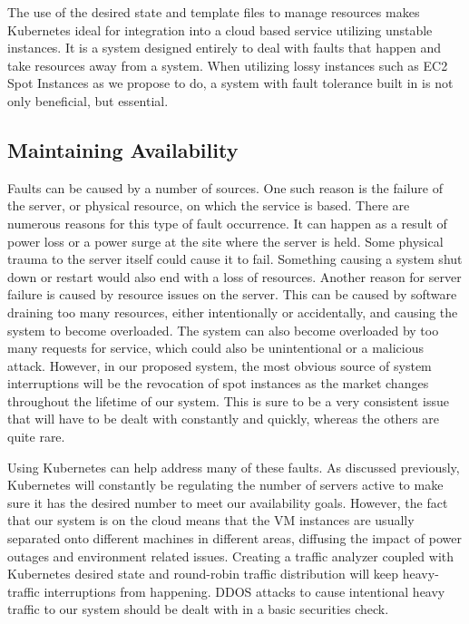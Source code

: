 \documentclass[thesis,proposal]{umassthesis}  %
\begin{document}
	The use of the desired state and template files to manage resources makes Kubernetes ideal for integration into a cloud based service utilizing unstable instances. It is a system designed entirely to deal with faults that happen and take resources away from a system. When utilizing lossy instances such as EC2 Spot Instances as we propose to do, a system with fault tolerance built in is not only beneficial, but essential.\par
    
\subsection{Maintaining Availability}

Faults can be caused by a number of sources. One such reason is the failure of the server, or physical resource, on which the service is based. There are numerous reasons for this type of fault occurrence. It can happen as a result of power loss or a power surge at the site where the server is held. Some physical trauma to the server itself could cause it to fail. Something causing a system shut down or restart would also end with a loss of resources. Another reason for server failure is caused by resource issues on the server. This can be caused by software draining too many resources, either intentionally or accidentally, and causing the system to become overloaded. The system can also become overloaded by too many requests for service, which could also be unintentional or a malicious attack. However, in our proposed system, the most obvious source of system interruptions will be the revocation of spot instances as the market changes throughout the lifetime of our system. This is sure to be a very consistent issue that will have to be dealt with constantly and quickly, whereas the others are quite rare.\par
    
Using Kubernetes can help address many of these faults. As discussed previously, Kubernetes will constantly be regulating the number of servers active to make sure it has the desired number to meet our availability goals. However, the fact that our system is on the cloud means that the VM instances are usually separated onto different machines in different areas, diffusing the impact of power outages and environment related issues. Creating a traffic analyzer coupled with Kubernetes desired state and round-robin traffic distribution will keep heavy-traffic interruptions from happening. DDOS attacks to cause intentional heavy traffic to our system should be dealt with in a basic securities check.\par
\end{document}
